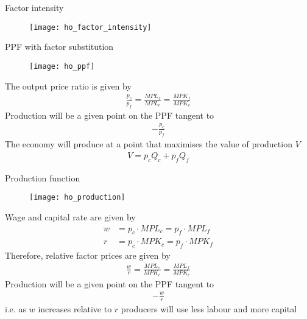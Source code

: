 \documentclass{beamer}
\begin{document}
\begin{frame}{Factor intensity}
  \begin{figure}
    \texttt{[image: ho\_factor\_intensity]}
  \end{figure}
\end{frame}

\begin{frame}{PPF with factor substitution}
  \begin{figure}
    \texttt{[image: ho\_ppf]}
  \end{figure}  
\end{frame}

\begin{frame}
  The output price ratio is given by
  \begin{align*}
    \frac{p_c}{p_f}=\frac{MPL_f}{MPL_c}=\frac{MPK_f}{MPK_c}
  \end{align*}
  Production will be a given point on the PPF tangent to
  \begin{align*}
  -\frac{p_c}{p_f}
  \end{align*}
  \medskip   
  The economy will produce at a point that maximises the value of production $V$  
  \begin{align*}
    V=p_cQ_c+p_fQ_f
  \end{align*}
\end{frame}

\begin{frame}{Production function}
  \begin{figure}
    \texttt{[image: ho\_production]}
  \end{figure}
\end{frame}

\begin{frame}
  Wage and capital rate are given by
  \begin{align*}
  w &= p_c\cdot MPL_c = p_f \cdot MPL_f\\
  r &= p_c \cdot MPK_c = p_f \cdot MPK_f
  \end{align*}
Therefore, relative factor prices are given by
  \begin{align*}
    \frac{w}{r}=\frac{MPL_c}{MPK_c}=\frac{MPL_f}{MPK_c}
  \end{align*}
  Production will be a given point on the PPF tangent to 
  \begin{align*}
  -\frac{w}{r}
  \end{align*}  
  i.e. as $w$ increases relative to $r$ producers will use less labour and more capital     
\end{frame}
\end{document}
